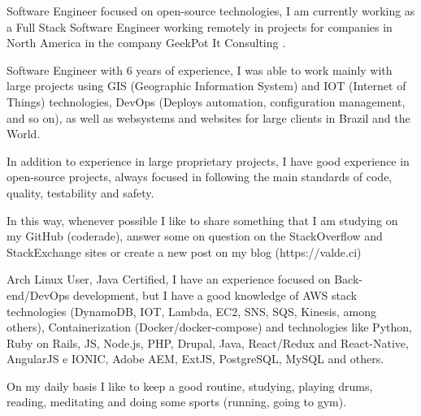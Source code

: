 

\begin{cvparagraph}

Software Engineer focused on open-source technologies, I am currently working as a Full Stack Software Engineer working remotely in projects for companies in North America in the company GeekPot It Consulting .

Software Engineer with 6 years of experience, I was able to work mainly with large projects using GIS (Geographic Information System) and IOT (Internet of Things) technologies, DevOps (Deploys automation, configuration management, and so on), as well as websystems and websites for large clients in Brazil and the World.

In addition to experience in large proprietary projects, I have good experience in open-source projects, always focused in following the main standards of code, quality, testability and safety.

In this way, whenever possible I like to share something that I am studying on my GitHub (coderade), answer some on question on the StackOverflow and StackExchange sites or create a new post on my blog (https://valde.ci)

Arch Linux User, Java Certified, I have an experience focused on Back-end/DevOps development, but I have a good knowledge of AWS stack technologies (DynamoDB, IOT, Lambda, EC2, SNS, SQS, Kinesis, among others), Containerization (Docker/docker-compose) and technologies like Python, Ruby on Rails, JS, Node.js, PHP, Drupal, Java, React/Redux and React-Native, AngularJS e IONIC, Adobe AEM, ExtJS, PostgreSQL, MySQL and others.

On my daily basis I like to keep a good routine, studying, playing drums, reading, meditating and doing some sports (running, going to gym).
\end{cvparagraph}
